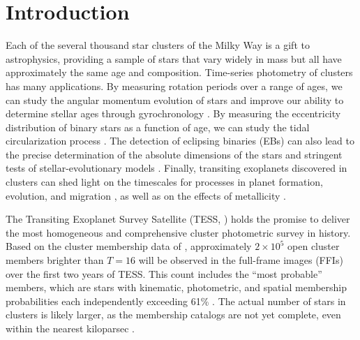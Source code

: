\documentclass[12pt,twocolumn,tighten]{aastex62}
\begin{document}



\section{Introduction}
\label{sec:intro}

Each of the several thousand star clusters of the Milky Way is a gift
to astrophysics, providing a sample of stars that vary widely in mass
but all have approximately the same age and composition.  Time-series
photometry of clusters has many applications. By measuring rotation
periods over a range of ages, we can study the angular momentum
evolution of stars and improve our ability to determine stellar ages
through gyrochronology \citep[{\it
e.g.},][]{skumanich_time_1972,barnes_color-period_2015,meibom_spin-down_2015,curtis_tess_2019}.
By measuring the eccentricity distribution of binary stars as a
function of age, we can study the tidal circularization process
\citep{meibom_robust_2005,milliman_wiyn_2014,price-whelan_binary_2018}.
The detection of eclipsing binaries (EBs) can also lead to the precise
determination of the absolute dimensions of the stars and stringent
tests of stellar-evolutionary models
\citep{luhman_formation_2012,stassun_review_2014,kraus_mass-radius_2015}.
Finally, transiting exoplanets discovered in clusters can shed light
on the timescales for processes in planet formation, evolution, and
migration
\citep[][]{Fortney_et_al_2007,Mann_K2_33b_2016,David_et_al_2017}, as
well as on the effects of metallicity
\citep[][]{fischer_planet-metallicity_2005,petigura_metallicity_2018}.

The Transiting Exoplanet Survey Satellite (TESS,
\citealt{ricker_transiting_2015}) holds the promise to deliver the
most homogeneous and comprehensive cluster photometric survey in
history.  Based on the cluster membership data of
\citet{Kharchenko_et_al_2013}, approximately $2\times10^5$ open
cluster members brighter than $T=16$ will be observed in the
full-frame images (FFIs) over the first two years of TESS.  This count includes the
\citeauthor{Kharchenko_et_al_2013} ``most probable'' members, which
are stars
with kinematic, photometric, and spatial membership
probabilities each independently exceeding 61\% \citep{kharchenko_global_2012}.  The
actual number of stars in clusters is likely larger, as the membership
catalogs are not yet complete, even within the nearest kiloparsec
\citep[{\it
e.g.},][]{roser_nine_RSG_2016,cantat-gaudin_gaia_2018,cantat-gaudin_newOCs_2019,kounkel_untangling_2019,sim_open_2019}.
\end{document}
